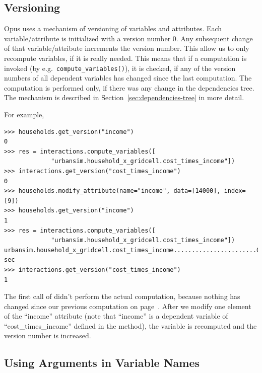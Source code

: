 \subsection{Versioning}
\label{sec:versioning}
%
Opus uses a mechanism of versioning of variables \variablesindex and attributes. \attributesindex Each
variable/attribute \variablesindex\attributesindex is initialized with a version number 0. Any subsequent
change of that variable/attribute \variablesindex\attributesindex increments the version number. This allow us
to only recompute variables, \variablesindex if it is really needed. This means that if a
computation is invoked (by e.g.\ \verb|compute_variables()|), \variablesindex it is checked, if
any of the version numbers of all dependent variables \variablesindex has changed since the
last computation. The computation is performed only, if there was any change
in the dependencies tree. The mechanism is described in Section~\ref{sec:dependencies-tree}
in more detail.

For example,
\variablesindex
\begin{verbatim}
>>> households.get_version("income")
0
>>> res = interactions.compute_variables([
             "urbansim.household_x_gridcell.cost_times_income"])
>>> interactions.get_version("cost_times_income")
0
>>> households.modify_attribute(name="income", data=[14000], index=[9])
>>> households.get_version("income")
1
>>> res = interactions.compute_variables([
             "urbansim.household_x_gridcell.cost_times_income"])
urbansim.household_x_gridcell.cost_times_income.......................0.0 sec
>>> interactions.get_version("cost_times_income")
1
\end{verbatim}

The first call of  didn't perform the actual
computation, because nothing has changed since our previous computation on
page~\pageref{page:compute-interaction}.
After we modify one element of the ``income'' attribute
(note that ``income'' is a dependent variable of
``cost_times_income'' defined in the  method), the
variable is recomputed and the version number is increased.

\subsection{Using Arguments in Variable Names}
\label{sec:tutorial-numbersinvariables}


